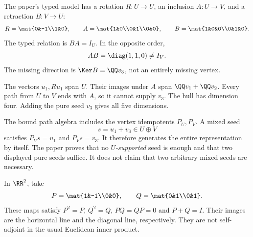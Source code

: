 
The paper's typed model has a rotation $R:U\to U$, an inclusion $A:U\to V$, and a retraction $B:V\to U$:
\[
R=\mat{0&-1\\1&0},\qquad
A=\mat{1&0\\0&1\\0&0},\qquad
B=\mat{1&0&0\\0&1&0}.
\]
The typed relation is $BA=I_U$. In the opposite order,
\[
AB=\diag(1,1,0)\ne I_V.
\]
The missing direction is $\Ker B=\QQ v_3$, not an entirely missing vertex.


The vectors $u_1,Ru_1$ span $U$. Their images under $A$ span $\QQ v_1+\QQ v_2$. Every path from $U$ to $V$ ends with $A$, so it cannot supply $v_3$. The hull has dimension four. Adding the pure seed $v_3$ gives all five dimensions.

The bound path algebra includes the vertex idempotents $P_U,P_V$. A mixed seed
\[
s=u_1+v_3\in U\oplus V
\]
satisfies $P_Us=u_1$ and $P_Vs=v_3$. It therefore generates the entire representation by itself. The paper proves that no \emph{$U$-supported} seed is enough and that two displayed pure seeds suffice. It does not claim that two arbitrary mixed seeds are necessary.


In $\RR^2$, take
\[
P=\mat{1&-1\\0&0},\qquad Q=\mat{0&1\\0&1}.
\]
These maps satisfy $P^2=P$, $Q^2=Q$, $PQ=QP=0$ and $P+Q=I$. Their images are the horizontal line and the diagonal line, respectively. They are not self-adjoint in the usual Euclidean inner product.

